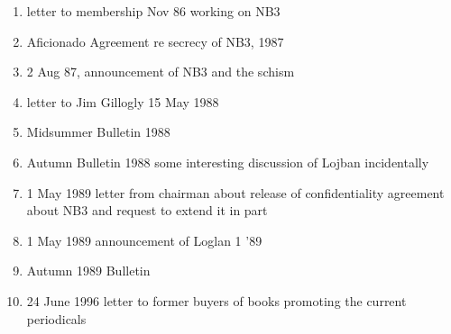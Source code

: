 \documentclass[12pt]{article}
\begin{document}
\begin{description}
\begin{enumerate}
\item letter to membership Nov 86  working on NB3

\item Aficionado Agreement re secrecy of NB3, 1987

\item 2 Aug 87, announcement of NB3 and the schism

\item letter to Jim Gillogly 15 May 1988

\item Midsummer Bulletin 1988

\item Autumn Bulletin 1988 some interesting discussion of Lojban incidentally

\item 1 May 1989 letter from chairman about release of confidentiality agreement about NB3 and request to extend it in part

\item  1 May 1989 announcement of Loglan 1 '89

\item Autumn 1989 Bulletin

\item 24 June 1996 letter to former buyers of books promoting the current periodicals

















\end{enumerate}


\end{description}
\end{document}

